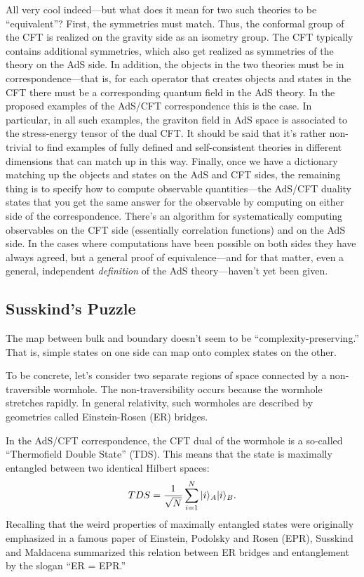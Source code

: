 \documentclass[12pt]{report}
\theoremstyle{plain}
\theoremstyle{definition}
\renewcommand{\ket}[1]{|#1\rangle}
\begin{document}
All very cool indeed---but what does it mean for two such theories to be ``equivalent''?  First, the symmetries must match.  Thus, the conformal group of the CFT is realized on the gravity side as an isometry group.   The CFT typically contains additional symmetries, which also get realized as symmetries of the theory on the AdS side.  In addition, the objects in the two theories must be in correspondence---that is, for each operator that creates objects and states in the CFT there must be a corresponding quantum field in the AdS theory.  In the proposed examples of the AdS/CFT correspondence this is the case.   In particular, in all such examples, the graviton field in AdS space is associated to the stress-energy tensor of the dual CFT.   It should be said that it's rather non-trivial to find examples of fully defined and self-consistent theories in different dimensions that can match up in this way.    Finally, once we have a dictionary matching up the objects and states on the AdS and CFT sides, the remaining thing is to specify how to compute observable quantities---the AdS/CFT duality states that you get the same answer for the observable by computing on either side of the correspondence.  There's an algorithm for systematically computing observables on the CFT side (essentially correlation functions) and on the AdS side.  In the cases where computations have been possible on both sides they have always agreed, but a general proof of equivalence---and for that matter, even a general, independent {\em definition} of the AdS theory---haven't yet been given.


\subsection{Susskind's Puzzle}

The map between bulk and boundary doesn't seem to be ``complexity-preserving.''   That is, simple states on one side can map onto complex states on the other.

 To be concrete, let's consider two separate regions of space connected by a non-traversible wormhole.  The non-traversibility occurs because the wormhole stretches rapidly.   In general relativity, such wormholes are described by geometries called Einstein-Rosen (ER) bridges.

In the AdS/CFT correspondence, the CFT dual of the wormhole is a so-called ``Thermofield Double State'' (TDS).   This means that the state is maximally entangled between two identical Hilbert spaces:
\begin{equation}
TDS = {1 \over \sqrt{N}} \sum_{i=1}^N \ket{i}_A \ket{i}_B.
\end{equation}
Recalling that the weird properties of maximally entangled states were originally emphasized in a famous paper of Einstein, Podolsky and Rosen (EPR), Susskind and Maldacena \cite{MS13} summarized this relation between ER bridges and entanglement by the slogan ``ER = EPR.''
\end{document}
